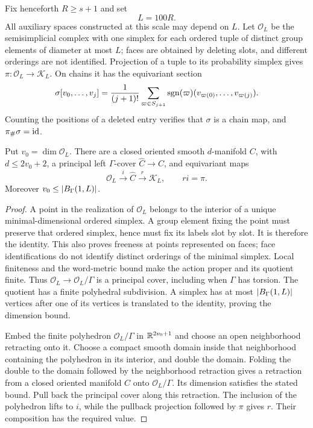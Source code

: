 Fix henceforth $R\ge s+1$ and set
\begin{equation}
\label{eq:comparison-scales}
 L=100R.
\end{equation}
All auxiliary spaces constructed at this scale may depend on $L$.
Let $\mathcal O_L$ be the semisimplicial complex with one simplex for
each ordered tuple of distinct group elements of diameter at most $L$;
faces are obtained by deleting slots, and different orderings are not
identified.  Projection of a tuple to its probability simplex gives
$\pi:\mathcal O_L\to\mathcal K_L$.  On chains it has the equivariant
section
\begin{equation}
\label{eq:ordered-section}
 \sigma[v_0,\ldots,v_j]
 =\frac1{(j+1)!}\sum_{\varpi\in S_{j+1}}
    \operatorname{sgn}(\varpi)(v_{\varpi(0)},\ldots,v_{\varpi(j)}).
\end{equation}
Counting the positions of a deleted entry verifies that $\sigma$ is a
chain map, and $\pi_\#\sigma=\operatorname{id}$.

\begin{lemma}
\label{lem:parameter-thickening}
Put $v_0=\dim\mathcal O_L$.  There are a closed oriented smooth
$d$-manifold $C$, with $d\le2v_0+2$, a principal left $\Gamma$-cover
$\widehat C\to C$, and equivariant maps
\[
 \mathcal O_L\xrightarrow{i}\widehat C
 \xrightarrow{r}\mathcal K_L,
 \qquad r i=\pi.
\]
Moreover $v_0\le\lvert B_\Gamma(1,L)\rvert$.
\end{lemma}

\begin{proof}
A point in the realization of $\mathcal O_L$ belongs to the interior of
a unique minimal-dimensional ordered simplex.  A group element fixing
the point must preserve that ordered simplex, hence must fix its labels
slot by slot.  It is therefore the identity.  This also proves freeness
at points represented on faces; face identifications do not identify
distinct orderings of the minimal simplex.  Local finiteness and the
word-metric bound make the action proper and its quotient finite.
Thus $\mathcal O_L\to\mathcal O_L/\Gamma$ is a principal cover, including
when $\Gamma$ has torsion.  The quotient has a finite polyhedral
subdivision.  A simplex has at most $\lvert B_\Gamma(1,L)\rvert$ vertices after
one of its vertices is translated to the identity, proving the
dimension bound.

Embed the finite polyhedron $\mathcal O_L/\Gamma$ in
$\mathbb R^{2v_0+1}$ and choose an open neighborhood retracting onto it.
Choose a compact smooth domain inside that neighborhood containing the
polyhedron in its interior, and double the domain.  Folding the double
to the domain followed by the neighborhood retraction gives a
retraction from a closed oriented manifold $C$ onto
$\mathcal O_L/\Gamma$.  Its dimension satisfies the stated bound.
Pull back the principal cover along this retraction.  The inclusion
of the polyhedron lifts to $i$, while the pullback projection followed
by $\pi$ gives $r$.  Their composition has the required value.
\end{proof}

